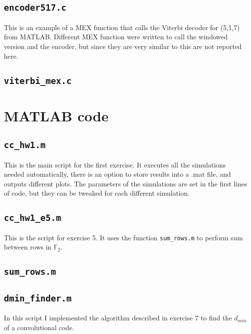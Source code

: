 \documentclass[10pt]{article}
\numberwithin{equation}{section}
\begin{document}
\subsection*{\texttt{encoder517.c}}


This is an example of a MEX function that calls the Viterbi decoder for (5,1,7) from MATLAB. Different MEX function were written to call the windowed version and the encoder, but since they are very similar to this are not reported here.

\subsection*{\texttt{viterbi\_mex.c}}


\section*{MATLAB code}

\subsection*{\texttt{cc\_hw1.m}}
This is the main script for the first exercise. It executes all the simulations needed automatically, there is an option to store results into a .mat file, and outputs different plots. The parameters of the simulations are set in the first lines of code, but they can be tweaked for each different simulation.


\subsection*{\texttt{cc\_hw1\_e5.m}}
This is the script for exercise 5. It uses the function \texttt{sum\_rows.m} to perform sum between rows in $\mathbb{F}_2$.

\subsection*{\texttt{sum\_rows.m}}


\subsection*{\texttt{dmin\_finder.m}} 
In this script I implemented the algorithm described in exercise 7 to find the $d_{min}$ of a convolutional code.

\end{document}
